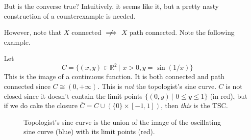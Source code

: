   But is the converse true? Intuitively, it seems like it, but a pretty nasty construction of a counterexample is needed. 

  However, note that $X$ connected $\centernot\implies$ $X$ path connected. Note the following example. 

  \begin{example}
    Let 
    \begin{equation}
      C = \{ (x, y) \in \mathbb{R}^2 \mid x > 0, y = \sin(1/x) \}
    \end{equation} 
    This is the image of a continuous function. It is both connected and path connected since $C \cong (0, +\infty)$. This is \textit{not} the topologist's sine curve. $C$ is not closed since it doesn't contain the limit points $\{(0, y) \mid 0 \leq y \leq 1 \}$ (in red), but if we do cake the closure $\overline{C} = C \cup (\{0\} \times [-1, 1])$, then \textit{this} is the TSC. 

    \begin{figure}[H]
      \centering 
      \caption{Topologist's sine curve is the union of the image of the oscillating sine curve (blue) with its limit points (red).} 
      \label{fig:top_sine_curve}
    \end{figure}


\end{example}
